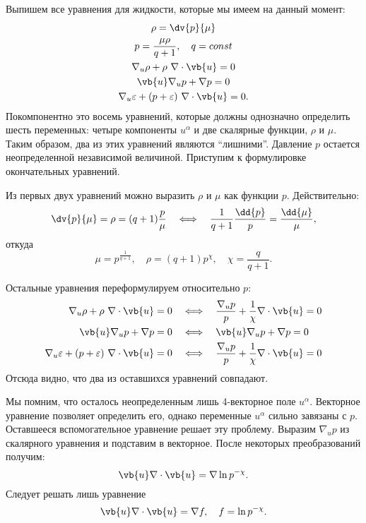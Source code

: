 \documentclass[\docroot/reports/draft/report.tex]{subfiles}
\begin{document}
    Выпишем все уравнения для жидкости, которые мы имеем на данный момент:
    \begin{gather}
        \rho = \dv{p}{\mu} \\
        p = \frac{\mu\rho}{q + 1} , \quad q = const \\
        \nabla_u \rho + \rho\ \nabla \cdot \vb{u} = 0 \\
        \vb{u} \nabla_u p + \nabla p = 0 \\
        \nabla_u \varepsilon + (p + \varepsilon)\ \nabla \cdot \vb{u} = 0 .
    \end{gather}
    Покомпонентно это восемь уравнений, которые должны однозначно определить шесть переменных: четыре компоненты $u^\alpha$ и две скалярные функции, $\rho$ и $\mu$. Таким образом, два из этих уравнений являются \enquote{лишними}. Давление $p$ остается неопределенной независимой величиной. Приступим к формулировке окончательных уравнений.

    Из первых двух уравнений можно выразить $\rho$ и $\mu$ как функции $p$. Действительно:
    \begin{equation*}
        \dv{p}{\mu} = \rho = (q + 1) \frac{p}{\mu} \quad\Longleftrightarrow\quad
        \frac{1}{q + 1} \frac{\dd{p}}{p} = \frac{\dd{\mu}}{\mu} ,
    \end{equation*}
    откуда
    \begin{equation*}
        \mu = p^{\frac{1}{q + 1}} , \quad \rho = (q + 1) p^{\chi} , \quad \chi = \frac{q}{q + 1} .
    \end{equation*}

    Остальные уравнения переформулируем относительно $p$:
    \begin{align*}
        \nabla_u \rho + \rho\ \nabla \cdot \vb{u} = 0 \quad&\Longleftrightarrow\quad
        \frac{\nabla_u p}{p} + \frac{1}{\chi} \nabla \cdot \vb{u} = 0 \\
        \vb{u} \nabla_u p + \nabla p = 0 \quad&\Longleftrightarrow\quad
        \vb{u} \nabla_u p + \nabla p = 0 \\
        \nabla_u \varepsilon + (p + \varepsilon)\ \nabla \cdot \vb{u} = 0 \quad&\Longleftrightarrow\quad
        \frac{\nabla_u p}{p} + \frac{1}{\chi} \nabla \cdot \vb{u} = 0
    \end{align*}
    Отсюда видно, что два из оставшихся уравнений совпадают.

    Мы помним, что осталось неопределенным лишь 4-векторное поле $u^\alpha$. Векторное уравнение позволяет определить его, однако переменные $u^\alpha$ сильно завязаны с $p$. Оставшееся вспомогательное уравнение решает эту проблему. Выразим $\nabla_u p$ из скалярного уравнения и подставим в векторное. После некоторых преобразований получим:
    \begin{equation}
        \vb{u} \nabla \cdot \vb{u} = \nabla \ln p^{-\chi} .
    \end{equation}
    Следует решать лишь уравнение
    \begin{equation}\label{eq:u-of-p}
        \vb{u} \nabla \cdot \vb{u} = \nabla f , \quad f = \ln p^{-\chi} .
    \end{equation}
\end{document}
